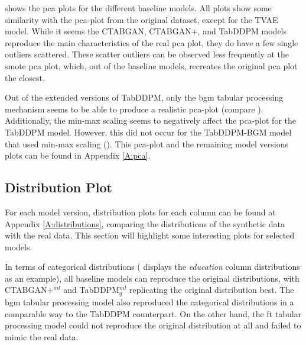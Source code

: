 shows the \gls{pca} plots for the different baseline models. 
All plots show some similarity with the \gls{pca}-plot from the original dataset, except for the TVAE \gls{model}. 
While it seems the CTABGAN, CTABGAN+, and TabDDPM models reproduce the main characteristics of the real \gls{pca} plot, they do have a few single outliers scattered.
These scatter outliers can be observed less frequently at the \gls{smote} \gls{pca} plot, which, out of the baseline models, recreates the original \gls{pca} plot the closest.


Out of the extended versions of TabDDPM, only the \gls{bgm} tabular processing mechanism seems to be able to produce a realistic \gls{pca}-plot (compare ).
Additionally, the min-max scaling seems to negatively affect the \gls{pca}-plot for the TabDDPM \gls{model}.
However, this did not occur for the TabDDPM-BGM \gls{model} that used min-max scaling ().
This \gls{pca}-plot and the remaining \gls{model} versions plots can be found in Appendix \ref{A:pca}.

\subsection{Distribution Plot}
\label{ch:results-Distr}


For each \gls{model} version, distribution plots for each column can be found at Appendix \ref{A:distributions}, comparing the distributions of the synthetic data with the real data.
This section will highlight some interesting plots for selected models.

In terms of categorical distributions ( displays the \textit{education} column distributions as an example), all baseline models can reproduce the original distributions,
with CTABGAN+$^{ml}$ and TabDDPM$^{ml}_q$ replicating the original distribution best.
The \gls{bgm} tabular processing \gls{model} also reproduced the categorical distributions in a comparable way to the TabDDPM counterpart.
On the other hand, the \gls{ft} tabular processing \gls{model} could not reproduce the original distribution at all and failed to mimic the real data.

